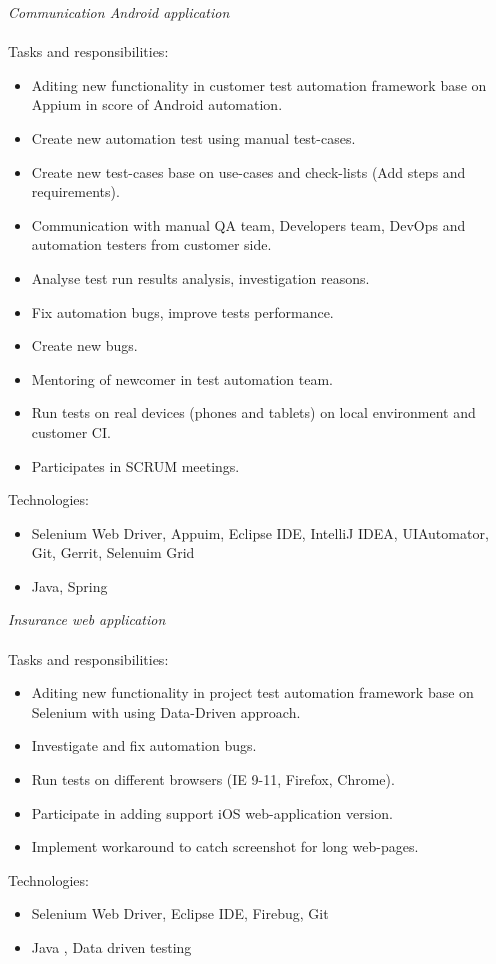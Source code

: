 \documentclass[margin, 10pt]{Stylesheet}
\begin{document}
\begin{resume}
\emph{Communication Android application} \\ \\
Tasks and responsibilities:
\begin{itemize} \itemsep -2pt
	\item Aditing new functionality in customer test automation framework base on Appium in score of Android automation.
	\item Create new automation test using manual test-cases. 
	\item Create new test-cases base on use-cases and check-lists (Add steps and requirements). 
	\item Communication with manual QA team, Developers team, DevOps and automation testers from customer side.
	\item Analyse test run results analysis, investigation reasons.
	\item Fix automation bugs, improve tests performance.
	\item Create new bugs.
	\item Mentoring of newcomer in test automation team.
	\item Run tests on real devices (phones and tablets) on local environment and customer CI.
	\item Participates in SCRUM meetings.
\end{itemize}
Technologies:
\begin{itemize} \itemsep -2pt
	\item Selenium Web Driver, Appuim, Eclipse IDE, IntelliJ IDEA, UIAutomator, Git, Gerrit, Selenuim Grid
	\item Java, Spring
\end{itemize}

\emph{Insurance web application} \\ \\
Tasks and responsibilities:
\begin{itemize} \itemsep -2pt
	\item Aditing new functionality in project test automation framework base on Selenium with using Data-Driven approach.
	\item Investigate and fix automation bugs.
	\item Run tests on different browsers (IE 9-11, Firefox, Chrome).
	\item Participate in adding support iOS web-application version.
	\item Implement workaround to catch screenshot for long web-pages.
\end{itemize}
Technologies:
\begin{itemize} \itemsep -2pt
	\item Selenium Web Driver, Eclipse IDE, Firebug, Git
	\item Java , Data driven testing
\end{itemize}


\end{resume}
\end{document}
